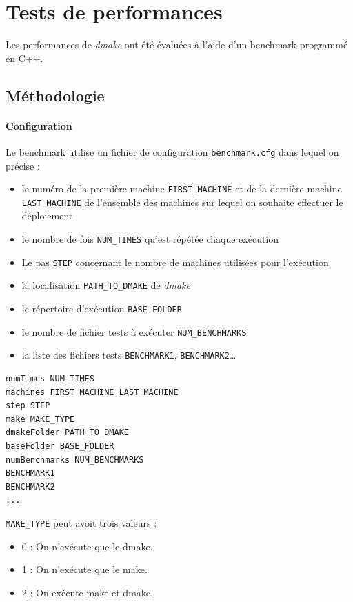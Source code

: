 \documentclass[a4paper,12pt,twoside]{article}
\begin{document}

\section{Tests de performances}

Les performances de \emph{dmake} ont été évaluées à l'aide d'un
benchmark programmé en C++.

\subsection{Méthodologie}

\paragraph{Configuration}
Le benchmark utilise un fichier de configuration
\texttt{benchmark.cfg} dans lequel on précise : 
\begin{itemize}
\item  le numéro de la première machine \texttt{FIRST\_MACHINE}
et de la dernière machine \texttt{LAST\_MACHINE} de l'ensemble des machines 
sur lequel on souhaite effectuer le déploiement
\item le nombre de fois
\texttt{NUM\_TIMES} qu'est répétée chaque exécution
\item Le pas \texttt{STEP} concernant le nombre de machines utilisées
  pour l'exécution
\item la localisation \texttt{PATH\_TO\_DMAKE} de \emph{dmake}
\item le répertoire d'exécution \texttt{BASE\_FOLDER}
\item le nombre de fichier tests à exécuter \texttt{NUM\_BENCHMARKS}
\item la liste des fichiers tests \texttt{BENCHMARK1}, \texttt{BENCHMARK2}\dots
\end{itemize}

\begin{verbatim}
numTimes NUM_TIMES
machines FIRST_MACHINE LAST_MACHINE
step STEP
make MAKE_TYPE
dmakeFolder PATH_TO_DMAKE
baseFolder BASE_FOLDER
numBenchmarks NUM_BENCHMARKS
BENCHMARK1
BENCHMARK2
...
\end{verbatim}

\texttt{MAKE\_TYPE} peut avoit trois valeurs :
\begin{itemize}
\item  0 : On n'exécute que le dmake.
\item  1 : On n'exécute que le make.
\item  2 : On exécute make et dmake.
\end{itemize}
\end{document}
